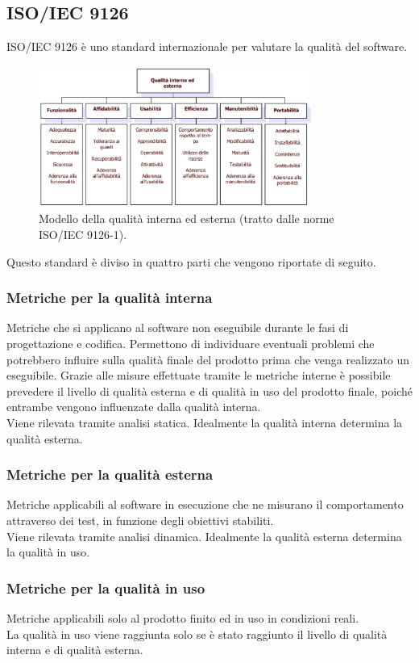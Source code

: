 \subsection{ISO/IEC 9126}
	ISO/IEC 9126 è uno standard internazionale per valutare la qualità del software.\\
    \begin{figure}[h]
        \includegraphics[width=9cm]{src/StandardQualita/img/iso_9126_1.png}
        \centering
        \caption{Modello della qualità interna ed esterna (tratto dalle norme ISO/IEC 9126-1).}
    \end{figure}
	Questo standard è diviso in quattro parti che vengono riportate di seguito.
		\subsubsection{Metriche per la qualità interna}
		Metriche che si applicano al software non eseguibile durante le fasi di progettazione e codifica. 
        Permettono di individuare eventuali problemi che potrebbero influire sulla qualità finale del prodotto prima 
        che venga realizzato un eseguibile. Grazie alle misure effettuate tramite le metriche interne è possibile prevedere 
        il livello di qualità esterna e di qualità in uso del prodotto finale, poiché entrambe vengono influenzate dalla qualità 
        interna.\\
		Viene rilevata tramite analisi statica. Idealmente la qualità interna determina la qualità esterna.
		\subsubsection{Metriche per la qualità esterna}
		Metriche applicabili al software in esecuzione che ne misurano il comportamento attraverso dei test, in funzione degli obiettivi stabiliti.\\
		Viene rilevata tramite analisi dinamica. Idealmente la qualità esterna determina la qualità in uso.
		\subsubsection{Metriche per la qualità in uso}
		Metriche applicabili solo al prodotto finito ed in uso in condizioni reali.\\
		La qualità in uso viene raggiunta solo se è stato raggiunto il livello di qualità interna e di qualità esterna.
